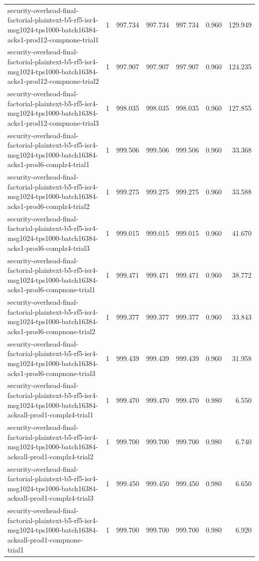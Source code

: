 \begin{tabular}{lrrrrrr}
security-overhead-final-factorial-plaintext-b5-rf5-isr4-msg1024-tps1000-batch16384-acks1-prod12-compnone-trial1 & 1 & 997.734 & 997.734 & 997.734 & 0.960 & 129.949 \\
security-overhead-final-factorial-plaintext-b5-rf5-isr4-msg1024-tps1000-batch16384-acks1-prod12-compnone-trial2 & 1 & 997.907 & 997.907 & 997.907 & 0.960 & 124.235 \\
security-overhead-final-factorial-plaintext-b5-rf5-isr4-msg1024-tps1000-batch16384-acks1-prod12-compnone-trial3 & 1 & 998.035 & 998.035 & 998.035 & 0.960 & 127.855 \\
security-overhead-final-factorial-plaintext-b5-rf5-isr4-msg1024-tps1000-batch16384-acks1-prod6-complz4-trial1 & 1 & 999.506 & 999.506 & 999.506 & 0.960 & 33.368 \\
security-overhead-final-factorial-plaintext-b5-rf5-isr4-msg1024-tps1000-batch16384-acks1-prod6-complz4-trial2 & 1 & 999.275 & 999.275 & 999.275 & 0.960 & 33.588 \\
security-overhead-final-factorial-plaintext-b5-rf5-isr4-msg1024-tps1000-batch16384-acks1-prod6-complz4-trial3 & 1 & 999.015 & 999.015 & 999.015 & 0.960 & 41.670 \\
security-overhead-final-factorial-plaintext-b5-rf5-isr4-msg1024-tps1000-batch16384-acks1-prod6-compnone-trial1 & 1 & 999.471 & 999.471 & 999.471 & 0.960 & 38.772 \\
security-overhead-final-factorial-plaintext-b5-rf5-isr4-msg1024-tps1000-batch16384-acks1-prod6-compnone-trial2 & 1 & 999.377 & 999.377 & 999.377 & 0.960 & 33.843 \\
security-overhead-final-factorial-plaintext-b5-rf5-isr4-msg1024-tps1000-batch16384-acks1-prod6-compnone-trial3 & 1 & 999.439 & 999.439 & 999.439 & 0.960 & 31.958 \\
security-overhead-final-factorial-plaintext-b5-rf5-isr4-msg1024-tps1000-batch16384-acksall-prod1-complz4-trial1 & 1 & 999.470 & 999.470 & 999.470 & 0.980 & 6.550 \\
security-overhead-final-factorial-plaintext-b5-rf5-isr4-msg1024-tps1000-batch16384-acksall-prod1-complz4-trial2 & 1 & 999.700 & 999.700 & 999.700 & 0.980 & 6.740 \\
security-overhead-final-factorial-plaintext-b5-rf5-isr4-msg1024-tps1000-batch16384-acksall-prod1-complz4-trial3 & 1 & 999.450 & 999.450 & 999.450 & 0.980 & 6.650 \\
security-overhead-final-factorial-plaintext-b5-rf5-isr4-msg1024-tps1000-batch16384-acksall-prod1-compnone-trial1 & 1 & 999.700 & 999.700 & 999.700 & 0.980 & 6.920 \\

\end{tabular}
